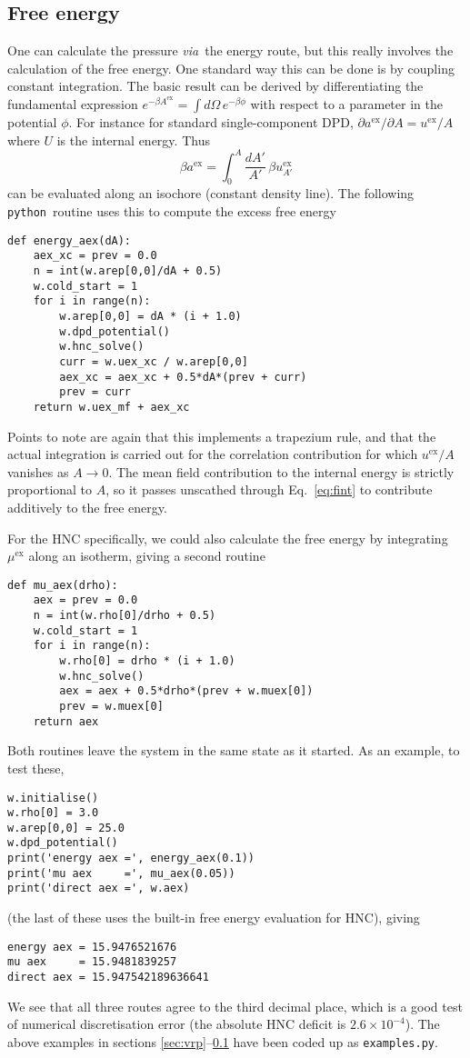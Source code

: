 \documentclass[12pt,a4paper]{article}
\newcommand{\latin}[1]{\emph{#1}}
\newcommand{\via}{\latin{via}}
\newcommand{\myex}{^{\mathrm{ex}}}
\newcommand{\uex}{u\myex}
\newcommand{\Aex}{A\myex}
\newcommand{\aex}{a\myex}
\newcommand{\muex}{\mu\myex}
\newcommand{\Eqref}[1]{Eq.~\eqref{#1}}
\newcommand{\python}{{\tt python}}
\begin{document}
\subsection{Free energy}
\label{sec:feng}
%
One can calculate the pressure \via\ the energy route, but this really
involves the calculation of the free energy.  One standard way this
can be done is by coupling constant integration.  The basic result can
be derived by differentiating the fundamental expression
$e^{-\beta\Aex} = \int\!d\Omega\,e^{-\beta \phi}$ with respect to a
parameter in the potential $\phi$.  For instance for standard
single-component DPD, ${\partial\aex}/{\partial A}={\uex}/{A}$ where $U$
is the internal energy.  Thus
%
\begin{equation}
{\beta \aex}=\int_0^A\frac{dA'}{A'}\,\beta\uex_{A'}
\label{eq:fint}
\end{equation}
%
can be evaluated along an isochore (constant density line).
The following \python\ routine uses this to compute the excess free
energy
%
\begin{verbatim}
def energy_aex(dA):
    aex_xc = prev = 0.0
    n = int(w.arep[0,0]/dA + 0.5)
    w.cold_start = 1
    for i in range(n):
        w.arep[0,0] = dA * (i + 1.0)
        w.dpd_potential()
        w.hnc_solve()
        curr = w.uex_xc / w.arep[0,0]
        aex_xc = aex_xc + 0.5*dA*(prev + curr)
        prev = curr
    return w.uex_mf + aex_xc
\end{verbatim}
%
Points to note are again that this implements a trapezium rule, and
that the actual integration is carried out for the correlation
contribution for which $\uex/A$ vanishes as $A\to0$.  The mean field
contribution to the internal energy is strictly proportional to $A$,
so it passes unscathed through \Eqref{eq:fint} to contribute additively
to the free energy.

For the HNC specifically, we could also calculate the free energy by
integrating $\muex$ along an isotherm, giving a second routine
%
\begin{verbatim}
def mu_aex(drho):
    aex = prev = 0.0
    n = int(w.rho[0]/drho + 0.5)
    w.cold_start = 1
    for i in range(n):
        w.rho[0] = drho * (i + 1.0)
        w.hnc_solve()
        aex = aex + 0.5*drho*(prev + w.muex[0])
        prev = w.muex[0]
    return aex
\end{verbatim}
%
Both routines leave the system in the same state as it started.  As an
example, to test these,
%
\begin{verbatim}
w.initialise()
w.rho[0] = 3.0
w.arep[0,0] = 25.0
w.dpd_potential()
print('energy aex =', energy_aex(0.1))
print('mu aex     =', mu_aex(0.05))
print('direct aex =', w.aex)
\end{verbatim}
%
(the last of these uses the built-in free energy evaluation for HNC), giving
%
\begin{verbatim}
energy aex = 15.9476521676
mu aex     = 15.9481839257
direct aex = 15.947542189636641
\end{verbatim}
%
We see that all three routes agree to the third decimal place, which
is a good test of numerical discretisation error (the absolute HNC
deficit is $2.6\times10^{-4}$).  The above examples in sections
\ref{sec:vrp}--\ref{sec:feng} have been coded up as
\verb+examples.py+.
\end{document}
